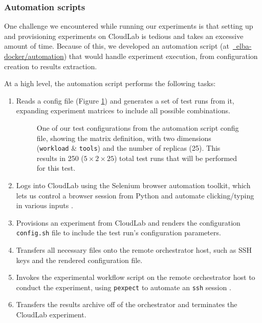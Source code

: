 \documentclass[a4paper,11pt]{article}
\newcommand{\github}[2]{\,\href{https://github.com/#1/#2}{\faGithub~#1/\linebreak[0]#2}\xspace}
\begin{document}
\subsubsection{Automation scripts}

One challenge we encountered while running our experiments is that setting up and provisioning experiments
on CloudLab is tedious and takes an excessive amount of time.
Because of this, we developed an automation script (at \github{elba-docker}{automation})
that would handle experiment execution, from configuration creation to results extraction.

At a high level, the automation script performs the following tasks:

\vspace{-0.55em}
\begin{enumerate}
    \itemsep0em 
    \item Reads a config file (Figure \ref{fig:config_matrix}) and generates a set of test runs from it,
    expanding experiment matrices to include all possible combinations.
    
    \begin{minipage}{\linewidth}
        \begin{figure}[H]
            \vspace{-0.25em}
            \caption{
                One of our test configurations from the automation script config file,
                showing the matrix definition, with two dimensions
                (\texttt{workload} \& \texttt{tools}) and the number of replicas (25).
                This results in 250 ($5\times2\times25$) total test runs
                that will be performed for this test.
            }
            \label{fig:config_matrix}
            \vspace{2.4em}
        \end{figure}
    \end{minipage}

    \item Logs into CloudLab using the Selenium browser automation toolkit,
    which lets us control a browser session from Python
    and automate clicking/typing in various inputs \cite{selenium}.
    \item Provisions an experiment from CloudLab and renders the configuration \texttt{config.sh} file
    to include the test run's configuration parameters.
    \item Transfers all necessary files onto the remote orchestrator host,
    such as SSH keys and the rendered configuration file.
    \item Invokes the experimental workflow script on the remote orchestrator host
    to conduct the experiment, using \texttt{pexpect} to automate an \texttt{ssh} session \cite{pexpect}.
    \item Transfers the results archive off of the orchestrator
    and terminates the CloudLab experiment.
\end{enumerate}
\vspace{-0.55em}
\end{document}
